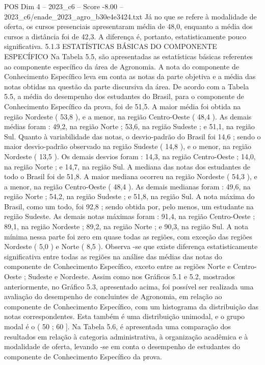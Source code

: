 \begin{textsample}{POS Dim 4 – 2023\_c6 – Score -8.00 – 2023\_c6/enade\_2023\_agro\_b30e4e3424.txt}
Já no que se refere à modalidade de oferta, os cursos presenciais apresentaram média de 48,0, enquanto a média dos cursos a distância foi de 42,3.
A diferença é, portanto, estatisticamente pouco significativa. 5.1.3 ESTATÍSTICAS BÁSICAS DO COMPONENTE ESPECÍFICO Na Tabela 5.5, são apresentadas as estatísticas básicas referentes ao componente específico da área de Agronomia.
A nota do componente de Conhecimento Específico leva em conta as notas da parte objetiva e a média das notas obtidas na questão da parte discursiva da área.
De acordo com a Tabela 5.5, a média do desempenho dos estudantes do Brasil, para o componente de Conhecimento Específico da prova, foi de 51,5.
A maior média foi obtida na região Nordeste ( 53,8 ), e a menor, na região Centro-Oeste ( 48,4 ).
As demais médias foram : 49,2, na região Norte ; 53,6, na região Sudeste ; e 51,1, na região Sul.
Quanto à variabilidade das notas, o desvio-padrão do Brasil foi 14,6 ; sendo o maior desvio-padrão observado na região Sudeste ( 14,8 ), e o menor, na região Nordeste ( 13,5 ).
Os demais desvios foram : 14,3, na região Centro-Oeste ; 14,0, na região Norte ; e 14,7, na região Sul.
A mediana das notas dos estudantes de todo o Brasil foi de 51,8.
A maior mediana ocorreu na região Nordeste ( 54,3 ), e a menor, na região Centro-Oeste ( 48,4 ).
As demais medianas foram : 49,6, na região Norte ; 54,2, na região Sudeste ; e 51,8, na região Sul.
A nota máxima do Brasil, como um todo, foi 92,8 ; sendo obtida por, pelo menos, um estudante na região Sudeste.
As demais notas máximas foram : 91,4, na região Centro-Oeste ; 89,1, na região Nordeste ; 89,2, na região Norte ; e 90,3, na região Sul.
A nota mínima nessa parte foi zero em quase todas as regiões, com exceção das regiões Nordeste ( 5,0 ) e Norte ( 8,5 ).
Observa -se que existe diferença estatisticamente significativa entre todas as regiões na análise das médias das notas do componente de Conhecimento Específico, exceto entre as regiões Norte e Centro-Oeste ; Sudeste e Nordeste.
Assim como nos Gráficos 5.1 e 5.2, mostrados anteriormente, no Gráfico 5.3, apresentado acima, foi possível ser realizada uma avaliação do desempenho de concluintes de Agronomia, em relação ao componente de Conhecimento Específico, com um histograma da distribuição das notas correspondentes.
Esta também é uma distribuição unimodal, e o grupo modal é o ( 50 ; 60 ].
Na Tabela 5.6, é apresentada uma comparação dos resultados em relação à categoria administrativa, à organização acadêmica e à modalidade de oferta, levando -se em conta o desempenho de estudantes do componente de Conhecimento Específico da prova.

\end{textsample}
